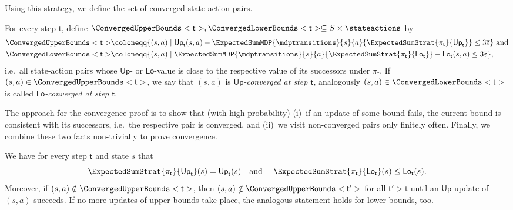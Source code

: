 \documentclass{theoretics}
\newcommand{\States}{S}
\newcommand{\strategy}{\pi}
\newcommand{\upperbound}{\mathsf{Up}}
\newcommand{\lowerbound}{\mathsf{Lo}}
\newcommand{\updatestep}{{\overline{\varepsilon}}}
\newcommand{\algostep}{\mathsf{t}}
\begin{document}
Using this strategy, we define the set of converged state-action pairs.
\begin{definition} \label{def:dql_no_ec:converged_bounds}
	For every step $\algostep$, define $\ConvergedUpperBounds<\algostep>, \ConvergedLowerBounds<\algostep> \subseteq \States \times \stateactions$ by
	\begin{align*}
		\ConvergedUpperBounds<\algostep> & \coloneqq \{(s, a) \mid \upperbound_\algostep(s, a) - \ExpectedSumMDP{\mdptransitions}{s}{a}{\ExpectedSumStrat{\strategy_\algostep}{\upperbound_\algostep}} \leq 3 \updatestep\} \text{ and}\\
		\ConvergedLowerBounds<\algostep> & \coloneqq \{(s, a) \mid \ExpectedSumMDP{\mdptransitions}{s}{a}{\ExpectedSumStrat{\strategy_\algostep}{\lowerbound_\algostep}} - \lowerbound_\algostep(s, a) \leq 3 \updatestep\},
	\end{align*}
	i.e.\ all state-action pairs whose $\upperbound$- or $\lowerbound$-value is close to the respective value of its successors under $\strategy_\algostep$.
	If $(s, a) \in \ConvergedUpperBounds<\algostep>$, we say that $(s, a)$ is \emph{$\upperbound$-converged at step $\algostep$}, analogously $(s, a) \in \ConvergedLowerBounds<\algostep>$ is called \emph{$\lowerbound$-converged at step $\algostep$}.
\end{definition}
The approach for the convergence proof is to show that (with high probability) (i)~if an update of some bound fails, the current bound is consistent with its successors, i.e.\ the respective pair is converged, and (ii)~we visit non-converged pairs only finitely often.
Finally, we combine these two facts non-trivially to prove convergence.
\begin{lemma} \label{stm:dql_no_ec:expected_sum_strategy} \label{stm:dql_no_ec:nonconverged_bounds_monotonic}
	We have for every step $\algostep$ and state $s$ that
	\begin{equation*}
		\ExpectedSumStrat{\strategy_\algostep}{\upperbound_\algostep}(s) = \upperbound_\algostep(s) \text{\quad and \quad} \ExpectedSumStrat{\strategy_\algostep}{\lowerbound_\algostep}(s) \leq \lowerbound_\algostep(s).
	\end{equation*}
	Moreover, if $(s, a) \notin \ConvergedUpperBounds<\algostep>$, then $(s, a) \notin \ConvergedUpperBounds<\algostep'>$ for all $\algostep' > \algostep$ until an $\upperbound$-update of $(s, a)$ succeeds.
	If no more updates of upper bounds take place, the analogous statement holds for lower bounds, too.
\end{lemma}
\end{document}
